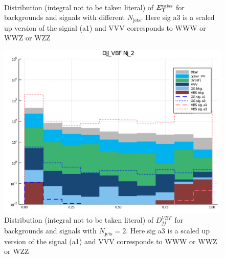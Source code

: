 \begin{figure}[htb]
\begin{center}
\\
\end{center}
\caption{Distribution (integral not to be taken literal) of $E_{\mathrm{T}}^{\mathrm{miss}}$ for backgrounds and signals with
different $N_\mathrm{jets}$. Here sig a3 is a scaled up version of the signal (a1) and VVV corresponds to
WWW or WWZ or WZZ}
\label{fig:1d_hists_met}
\end{figure}

\begin{figure}[htb]
\begin{center}
\includegraphics[width=.7\linewidth]{fig/DJJ_VBF_Nj_2.png}
\end{center}
\caption{Distribution (integral not to be taken literal) of $D_{j j}^{V B F}$ for backgrounds and signals with
$N_\mathrm{jets}=2$. Here sig a3 is a scaled up version of the signal (a1) and VVV corresponds to
WWW or WWZ or WZZ}
\label{fig:1d_hists_djjvbf}
\end{figure}
